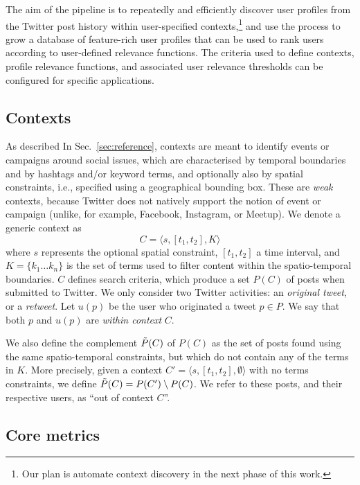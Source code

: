 \documentclass[runningheads]{llncs}
\begin{document}
The aim of the pipeline is to repeatedly and efficiently discover user profiles from the Twitter post history within user-specified contexts,\footnote{Our plan is automate context discovery in the next phase of this work.} and use the process to grow a database of feature-rich user profiles that can be used to rank users according to user-defined relevance functions. 
The criteria used to define contexts, profile relevance functions, and associated user relevance thresholds can be configured for specific applications.

\subsection{Contexts} \label{sec:contexts}

As described In Sec.~\ref{sec:reference}, contexts are meant to identify events or campaigns around social issues, which are characterised by temporal boundaries and by hashtags and/or keyword terms, and optionally also by spatial constraints, i.e., specified using a geographical bounding box.
These are \textit{weak} contexts, because Twitter does not natively support the notion of event or campaign (unlike, for example, Facebook, Instagram, or Meetup).
We  denote a generic context as
\begin{equation}
C = \langle s, [t_1, t_2], K \rangle 
\label{eq:context}
\end{equation}
where  $s$ represents the optional spatial constraint, $[t_1, t_2]$ a time interval, and $K = \{ k_1 \dots k_n\}$ is the set of terms used to filter content within the spatio-temporal boundaries.
%
$C$ defines search criteria, which produce a set $P(C)$ of posts when submitted to Twitter.
We only consider two Twitter activities: an \textit{original tweet}, or a \textit{retweet}.
Let $u(p)$ be the user who originated a tweet $p \in P$.
We say that both $p$ and  $u(p)$ are \textit{within context} $C$.

We also define the complement $\Tilde{P}(C)$ of $P(C)$ as the set of posts found using the same spatio-temporal constraints, but which do not contain any of the terms in $K$. More precisely, given a  context $C'= \langle s, [t_1, t_2], \emptyset \rangle$ with no terms constraints, we define $\Tilde{P}(C) = P(C') \setminus P(C)$. 
We refer to these posts, and their respective users, as ``out of context $C$''.

\subsection{Core metrics}
\end{document}
